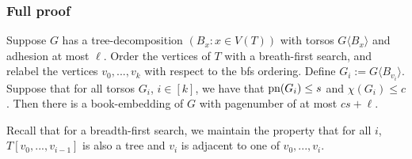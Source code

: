 \subsubsection{Full proof}
\begin{theorem}
	Suppose \(G\) has a tree-decomposition \((B_x: x \in V(T))\) with torsos \(G \langle B_x \rangle\) and adhesion at most \(\ell\). Order the vertices of \(T\) with a breath-first search, and relabel the vertices \(v_0, ..., v_k\) with respect to the bfs ordering. Define \(G_i := G \langle B_{v_i} \rangle \). Suppose that for all torsos \(G_i\), \(i \in [k]\), we have that \(\text{pn}(G_i) \leq s\) and \(\chi(G_i) \leq c\). Then there is a book-embedding of \(G\) with pagenumber of at most \(cs + \ell\). 
\end{theorem}
Recall that for a breadth-first search, we maintain the property that for all \(i\), \(T[v_0, ..., v_{i - 1}]\) is also a tree and \(v_i\) is adjacent to one of \(v_0, ..., v_{i}\). 
